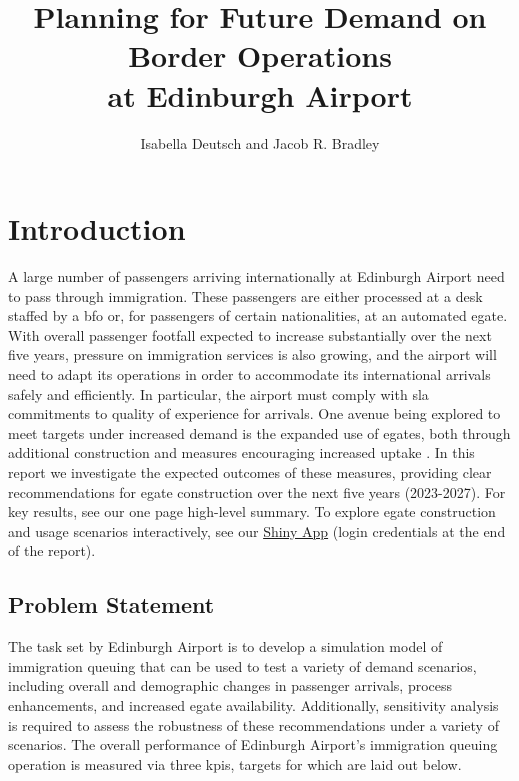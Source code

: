 \documentclass[10pt]{article}
\title{Planning for Future Demand on Border Operations\\ at Edinburgh Airport}
\author{Isabella Deutsch and Jacob R. Bradley}
\date{}
\begin{document}
\pagestyle{fancy}
\maketitle

\section{Introduction}
A large number of passengers arriving internationally at Edinburgh Airport need to pass through immigration. These passengers are either processed at a desk staffed by a \gls{bfo} or, for passengers of certain nationalities, at an automated \gls{egate}. With overall passenger footfall expected to increase substantially over the next five years, pressure on immigration services is also growing, and the airport will need to adapt its operations in order to accommodate its international arrivals safely and efficiently. In particular, the airport must comply with \gls{sla} commitments to quality of experience for arrivals. One avenue being explored to meet targets under increased demand is the expanded use of \glspl{egate}, both through additional construction and measures encouraging increased uptake \cite{UK_border_2025}. In this report we investigate the expected outcomes of these measures, providing clear recommendations for \gls{egate} construction over the next five years (2023-2027). For key results, see our one page high-level summary. To explore \gls{egate} construction and usage scenarios interactively, see our \href{https://jacob-bradley.shinyapps.io/shiny/}{Shiny App} (login credentials at the end of the report).

\subsection{Problem Statement}
The task set by Edinburgh Airport is to develop a simulation model of immigration queuing that can be used to test a variety of demand scenarios, including overall and demographic changes in passenger arrivals, process enhancements, and increased \gls{egate} availability. 
Additionally, sensitivity analysis is required to assess the robustness of these recommendations under a variety of scenarios.
The overall performance of Edinburgh Airport's immigration queuing operation is measured via three \glspl{kpi}, targets for which are laid out below.
\end{document}
